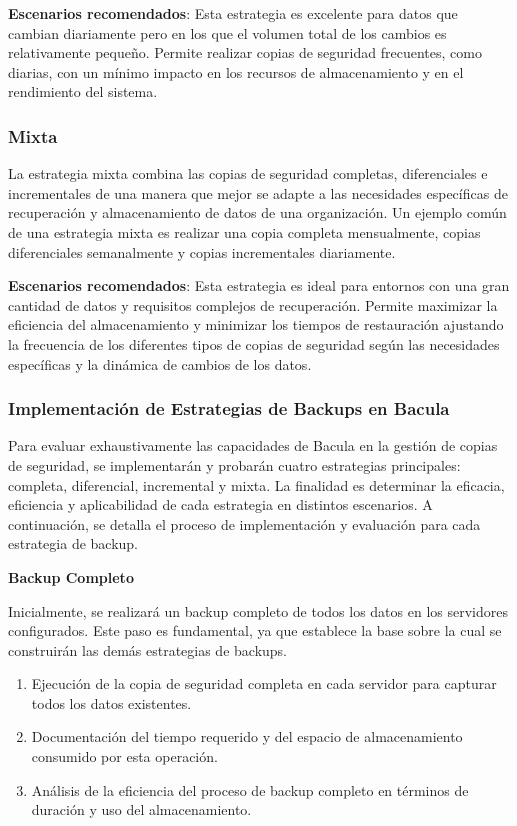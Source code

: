 \textbf{Escenarios recomendados}: Esta estrategia es excelente para datos que cambian diariamente pero en los que el volumen total de los cambios es relativamente pequeño. Permite realizar copias de seguridad frecuentes, como diarias, con un mínimo impacto en los recursos de almacenamiento y en el rendimiento del sistema.

\subsubsection{Mixta}
La estrategia mixta combina las copias de seguridad completas, diferenciales e incrementales de una manera que mejor se adapte a las necesidades específicas de recuperación y almacenamiento de datos de una organización. Un ejemplo común de una estrategia mixta es realizar una copia completa mensualmente, copias diferenciales semanalmente y copias incrementales diariamente.

\textbf{Escenarios recomendados}: Esta estrategia es ideal para entornos con una gran cantidad de datos y requisitos complejos de recuperación. Permite maximizar la eficiencia del almacenamiento y minimizar los tiempos de restauración ajustando la frecuencia de los diferentes tipos de copias de seguridad según las necesidades específicas y la dinámica de cambios de los datos.

\subsubsection{Implementación de Estrategias de Backups en Bacula}

Para evaluar exhaustivamente las capacidades de Bacula en la gestión de copias de seguridad, se implementarán y probarán cuatro estrategias principales: completa, diferencial, incremental y mixta. La finalidad es determinar la eficacia, eficiencia y aplicabilidad de cada estrategia en distintos escenarios. A continuación, se detalla el proceso de implementación y evaluación para cada estrategia de backup.


\textbf{Backup Completo}

Inicialmente, se realizará un backup completo de todos los datos en los servidores configurados. Este paso es fundamental, ya que establece la base sobre la cual se construirán las demás estrategias de backups.

\begin{enumerate}
    \item Ejecución de la copia de seguridad completa en cada servidor para capturar todos los datos existentes.
    \item Documentación del tiempo requerido y del espacio de almacenamiento consumido por esta operación.
    \item Análisis de la eficiencia del proceso de backup completo en términos de duración y uso del almacenamiento.
\end{enumerate}

